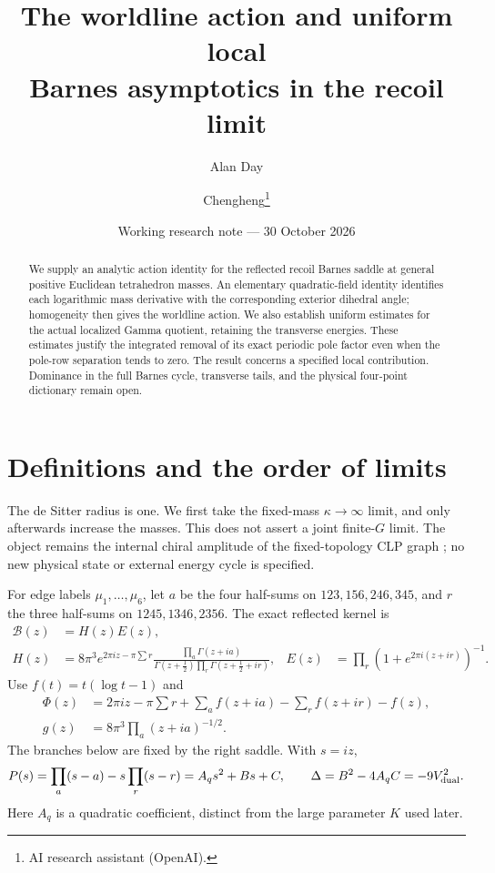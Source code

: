 \documentclass[11pt,a4paper]{article}
\title{The worldline action and uniform local\\Barnes asymptotics in the recoil limit}
\author{Alan Day \and Chengheng\thanks{AI research assistant (OpenAI).}}
\date{Working research note --- 30 October 2026}
\begin{document}
\maketitle
\begin{abstract}
We supply an analytic action identity for the reflected recoil
Barnes saddle at general positive Euclidean tetrahedron masses.
An elementary quadratic-field identity identifies each logarithmic
mass derivative with the corresponding exterior dihedral angle;
homogeneity then gives the worldline action. We also establish
uniform estimates for the actual localized Gamma quotient,
retaining the transverse energies. These estimates justify the
integrated removal of its exact periodic pole factor even when the
pole-row separation tends to zero. The result concerns a specified
local contribution. Dominance in the full Barnes cycle, transverse
tails, and the physical four-point dictionary remain open.
\end{abstract}

\section{Definitions and the order of limits}
The de Sitter radius is one. We first take the fixed-mass
\(\kappa\to\infty\) limit, and only afterwards increase the masses.
This does not assert a joint finite-\(G\) limit. The object remains
the internal chiral amplitude of the fixed-topology CLP graph
\cite{CLP}; no new physical state or external energy cycle is specified.

For edge labels \(\mu_1,\ldots,\mu_6\), let \(a\) be the four
half-sums on \(123,156,246,345\), and \(r\) the three half-sums on
\(1245,1346,2356\). The exact reflected kernel is
\begin{align}
 \mathcal B(z)&=H(z)E(z),\\
 H(z)&=8\pi^3e^{2\pi iz-\pi\sum r}
 \frac{\prod_a\Gamma(z+ia)}
 {\Gamma(z+\tfrac12)\prod_r\Gamma(z+\tfrac12+ir)},&
 E(z)&=\prod_r(1+e^{2\pi i(z+ir)})^{-1}.
 \label{eq:exact}
\end{align}
Use \(f(t)=t(\log t-1)\) and
\begin{align}
 \Phi(z)&=2\pi iz-\pi\sum r+
 \sum_a f(z+ia)-\sum_r f(z+ir)-f(z),\\
 g(z)&=8\pi^3\prod_a(z+ia)^{-1/2}.
\end{align}
The branches below are fixed by the right saddle. With \(s=iz\),
\[
 P(s)=\prod_a(s-a)-s\prod_r(s-r)=A_qs^2+Bs+C,\qquad
 \Delta=B^2-4A_qC=-9V_{\rm dual}^2.
\]
Here \(A_q\) is a quadratic coefficient, distinct from the large
parameter \(K\) used later.
\end{document}
